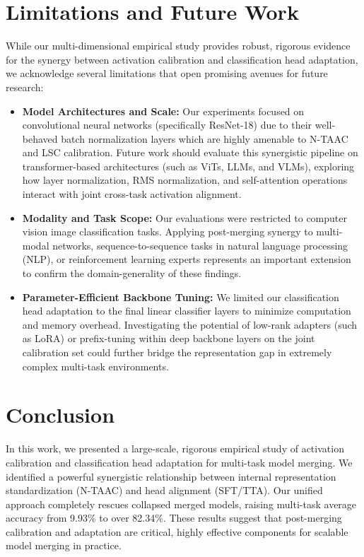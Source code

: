 \documentclass{article}
\theoremstyle{plain}
\theoremstyle{definition}
\theoremstyle{remark}
\begin{document}
\section{Limitations and Future Work}
\label{sec:limitations}
While our multi-dimensional empirical study provides robust, rigorous evidence for the synergy between activation calibration and classification head adaptation, we acknowledge several limitations that open promising avenues for future research:
\begin{itemize}
    \item \textbf{Model Architectures and Scale:} Our experiments focused on convolutional neural networks (specifically ResNet-18) due to their well-behaved batch normalization layers which are highly amenable to N-TAAC and LSC calibration. Future work should evaluate this synergistic pipeline on transformer-based architectures (such as ViTs, LLMs, and VLMs), exploring how layer normalization, RMS normalization, and self-attention operations interact with joint cross-task activation alignment.
    \item \textbf{Modality and Task Scope:} Our evaluations were restricted to computer vision image classification tasks. Applying post-merging synergy to multi-modal networks, sequence-to-sequence tasks in natural language processing (NLP), or reinforcement learning experts represents an important extension to confirm the domain-generality of these findings.
    \item \textbf{Parameter-Efficient Backbone Tuning:} We limited our classification head adaptation to the final linear classifier layers to minimize computation and memory overhead. Investigating the potential of low-rank adapters (such as LoRA) or prefix-tuning within deep backbone layers on the joint calibration set could further bridge the representation gap in extremely complex multi-task environments.
\end{itemize}

\section{Conclusion}
\label{sec:conclusion}
In this work, we presented a large-scale, rigorous empirical study of activation calibration and classification head adaptation for multi-task model merging. We identified a powerful synergistic relationship between internal representation standardization (N-TAAC) and head alignment (SFT/TTA). Our unified approach completely rescues collapsed merged models, raising multi-task average accuracy from 9.93\% to over 82.34\%. These results suggest that post-merging calibration and adaptation are critical, highly effective components for scalable model merging in practice.
\end{document}
